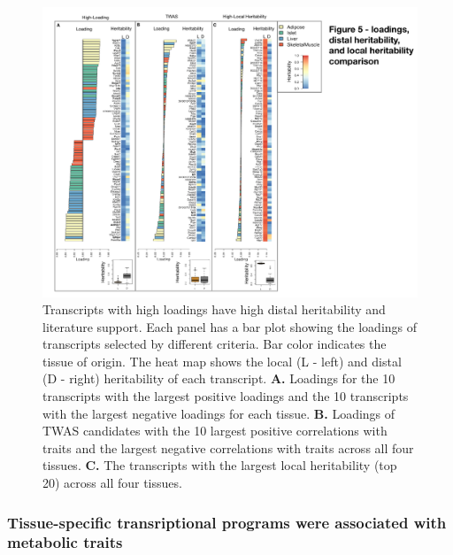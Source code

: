 \documentclass[
]{article}
\begin{document}
\begin{figure}[ht!]
\includegraphics[width=\textwidth]{Figures/Fig5_loading_heritability.pdf} 
\caption{Transcripts with high loadings have high distal heritability
and literature support. Each panel has a bar plot showing the loadings 
of transcripts selected by different criteria. Bar color indicates the 
tissue of origin. The heat map shows the local (L - left) and distal 
(D - right) heritability of each transcript. \textbf{A.} Loadings for 
the 10 transcripts with the largest positive loadings and the 10 
transcripts with the largest negative loadings for each tissue. 
\textbf{B.} Loadings of TWAS candidates with the 10 largest positive 
correlations with traits and the largest negative correlations with 
traits across all four tissues. \textbf{C.} The transcripts with the 
largest local heritability (top 20) across all four tissues.
}
\label{fig:loading_heritability}
\end{figure}

\subsubsection{Tissue-specific transriptional programs were associated
with metabolic
traits}\label{tissue-specific-transriptional-programs-were-associated-with-metabolic-traits}
\end{document}
